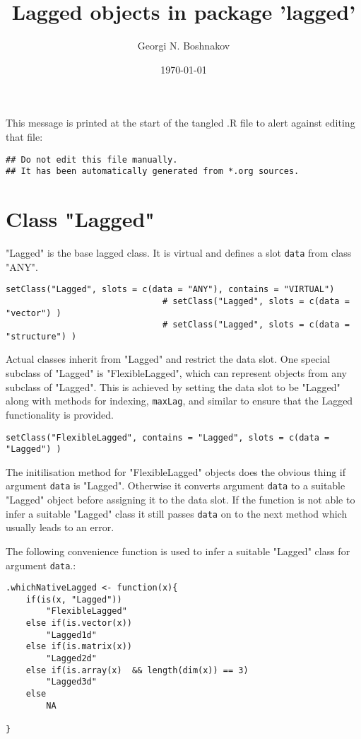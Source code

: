 \documentclass[11pt,a4paper]{article}
\author{Georgi N. Boshnakov}
\date{\today}
\title{Lagged objects in package 'lagged'}
\begin{document}
\maketitle
\tableofcontents

\vspace*{1cm}
This message is printed at the start of the tangled .R file to alert against editing that
file:
\begin{verbatim}
## Do not edit this file manually.
## It has been automatically generated from *.org sources.
\end{verbatim}



\section{Class "Lagged"}
\label{sec:org5ef7378}


"Lagged" is the base lagged class. It is virtual and defines a slot \texttt{data} from class
"ANY".
\begin{verbatim}
setClass("Lagged", slots = c(data = "ANY"), contains = "VIRTUAL")
                               # setClass("Lagged", slots = c(data = "vector") )
                               # setClass("Lagged", slots = c(data = "structure") )
\end{verbatim}

Actual classes inherit from "Lagged" and restrict the data slot.  One special subclass
of "Lagged" is "FlexibleLagged", which can represent objects from any subclass of
"Lagged". This is achieved by setting  the data slot to be "Lagged" along with methods for
indexing, \texttt{maxLag}, and similar to ensure that the Lagged functionality is provided.
\begin{verbatim}
setClass("FlexibleLagged", contains = "Lagged", slots = c(data = "Lagged") )
\end{verbatim}
The initilisation method for "FlexibleLagged" objects does the obvious thing if argument
\texttt{data} is "Lagged". Otherwise it converts argument \texttt{data} to a suitable "Lagged" object
before assigning it to the data slot. If the function is not able to infer a suitable
"Lagged" class it still passes \texttt{data} on to the next method which usually leads to an error.

The following convenience function is used to infer a suitable "Lagged" class for argument
\texttt{data}.:
\begin{verbatim}
.whichNativeLagged <- function(x){
    if(is(x, "Lagged"))
        "FlexibleLagged"
    else if(is.vector(x))
        "Lagged1d"
    else if(is.matrix(x))
        "Lagged2d"
    else if(is.array(x)  && length(dim(x)) == 3)
        "Lagged3d"
    else
        NA

}
\end{verbatim}
\end{document}
